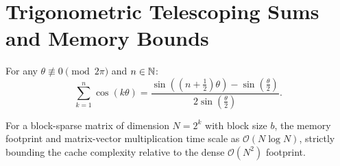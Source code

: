 \section{Trigonometric Telescoping Sums and Memory Bounds}

\begin{theorem}
\label{thm:trig_telescoping}
\leanok
For any $\theta \not\equiv 0 \pmod{2\pi}$ and $n \in \mathbb{N}$:
\[
\sum_{k=1}^n \cos(k \theta) = \frac{\sin\left(\left(n + \frac{1}{2}\right)\theta\right) - \sin\left(\frac{\theta}{2}\right)}{2 \sin\left(\frac{\theta}{2}\right)}.
\]
\end{theorem}

\begin{theorem}
\label{thm:memory_bound}
\leanok
For a block-sparse matrix of dimension $N = 2^k$ with block size $b$, the memory footprint and matrix-vector multiplication time scale as $\mathcal{O}(N \log N)$, strictly bounding the cache complexity relative to the dense $\mathcal{O}(N^2)$ footprint.
\end{theorem}
